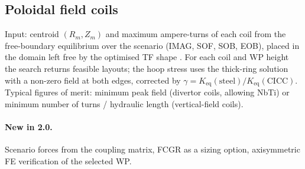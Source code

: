 \subsection{Poloidal field coils}
Input: centroid $(R_m,Z_m)$ and maximum ampere-turns of each coil from the
free-boundary equilibrium over the scenario (IMAG, SOF, SOB, EOB), placed
in the domain left free by the optimised TF shape
\cite{Giannini2024MADEIII}. For each coil and WP height the search returns
feasible layouts; the hoop stress uses the thick-ring solution with a
non-zero field at both edges, corrected by
$\gamma=K_\mathrm{eq}(\mathrm{steel})/K_\mathrm{eq}(\mathrm{CICC})$.
Typical figures of merit: minimum peak field (divertor coils, allowing
NbTi) or minimum number of turns / hydraulic length (vertical-field
coils).
\paragraph{New in 2.0.} Scenario forces from the coupling matrix, FCGR as a
sizing option, axisymmetric FE verification of the selected WP.

